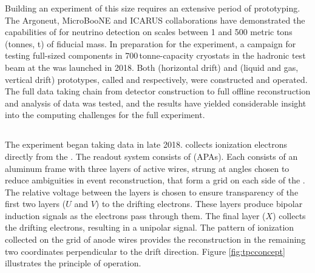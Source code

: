 \documentclass[../main-v1.tex]{subfiles}
\begin{document}
Building an experiment of this size requires an extensive period of prototyping.   The Argoneut\cite{Acciarri:2018myr}, MicroBooNE\cite{microboone} and ICARUS\cite{icarus} collaborations have demonstrated the capabilities of  for neutrino detection on scales between 1 and 500 metric tons (tonnes, t) of fiducial mass.  In preparation for the  experiment, a campaign for testing %
full-sized  components in 700\,tonne-capacity cryostats %
in the  hadronic test beam at the  was launched in 2018.  Both  (horizontal drift) and  (liquid and gas, vertical drift) prototypes, called  and  respectively, were constructed and operated. %
The full data taking chain from detector construction to full offline reconstruction and analysis of data was tested, and the results have yielded considerable insight into the computing challenges for the full  experiment.

\subsection{} %
The  experiment began taking data %
in late 2018.   %
collects ionization electrons %
directly from the . The readout system consists of  %
 (APAs).
Each  consists of an aluminum frame with three layers of active wires, strung at angles chosen to reduce ambiguities in event reconstruction, that form a grid on each side of the . The relative voltage between the layers is chosen to ensure transparency of the first two layers ($U$ and $V$) to the drifting electrons. These layers produce bipolar induction signals as the electrons pass through them. The final layer ($X$) collects the drifting electrons, resulting in a unipolar signal. The pattern of ionization collected on the grid of anode wires provides the reconstruction in the remaining two coordinates perpendicular to the drift direction. 
Figure \ref{fig:tpcconcept} illustrates the principle of operation. %
\end{document}
